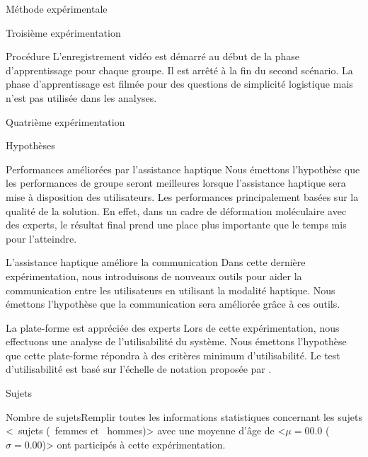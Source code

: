 \documentclass[myfrancais]{mythesis}
\begin{document}
\begin{mychapter}{Méthode expérimentale}
\begin{mysection}{Troisième expérimentation}
\begin{mysubsection}{Procédure}
				L'enregistrement vidéo est démarré au début de la phase d'apprentissage pour chaque groupe.
				Il est arrêté à la fin du second scénario.
				La phase d'apprentissage est filmée pour des questions de simplicité logistique mais n'est pas utilisée dans les analyses.
			\end{mysubsection}
		\end{mysection}
		\begin{mysection}{Quatrième expérimentation}
			\begin{mysubsection}{Hypothèses}
				\begin{myparagraph}{ Performances améliorées par l'assistance haptique}
					Nous émettons l'hypothèse que les performances de groupe seront meilleures lorsque l'assistance haptique sera mise à disposition des utilisateurs.
					Les performances principalement basées sur la qualité de la solution.
					En effet, dans un cadre de déformation moléculaire avec des experts, le résultat final prend une place plus importante que le temps mis pour l'atteindre.
				\end{myparagraph}
				\begin{myparagraph}{ L'assistance haptique améliore la communication}
					Dans cette dernière expérimentation, nous introduisons de nouveaux outils pour aider la communication entre les utilisateurs en utilisant la modalité haptique.
					Nous émettons l'hypothèse que la communication sera améliorée grâce à ces outils.
				\end{myparagraph}
				\begin{myparagraph}{ La plate-forme est appréciée des experts}
					Lors de cette expérimentation, nous effectuons une analyse de l'utilisabilité du système.
					Nous émettons l'hypothèse que cette plate-forme répondra à des critères minimum d'utilisabilité.
					Le test d'utilisabilité est basé sur l'échelle de notation proposée par .
				\end{myparagraph}
			\end{mysubsection}
			\begin{mysubsection}{Sujets}
				\begin{myTodo}{Nombre de sujets}{Remplir toutes les informations statistiques concernant les sujets}
					\textcolor{myred}{<\mynum{000}~sujets (~femmes et ~hommes)>} avec une moyenne d'âge de \textcolor{myred}{<$\mu = 00.0$ ($\sigma = 0.00$)>} ont participés à cette expérimentation.

\end{myTodo}
\end{mysubsection}
\end{mysection}
\end{mychapter}
\end{document}

